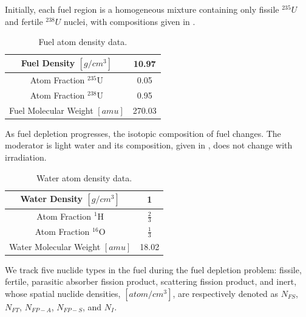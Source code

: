 Initially, each fuel region is a homogeneous mixture containing only fissile $^{235}U$ and fertile $^{238}U$ nuclei, with compositions given in .
\begin{table}[!htp]
\centering
\caption{Fuel atom density data.}
\begin{tabular}{|c|c|}
\hline
Fuel Density $[g/cm^3]$  & 10.97 \\
\hline
Atom Fraction $^{235}\text{U}$	& 0.05 \\
\hline
Atom Fraction $^{238}\text{U}$ & 0.95 \\
\hline
Fuel Molecular Weight $[amu]$ & 270.03\\
\hline
\end{tabular}
\label{tbl:fuel_atom_density}
\end{table}
%
As fuel depletion progresses, the isotopic composition of fuel changes.
The moderator is light water and its composition, given in , does not change with irradiation.
\begin{table}[!htp]
\centering
\caption{Water atom density data.}
\begin{tabular}{|c|c|}
\hline
Water Density $[g/cm^3]$  & 1 \\
\hline
Atom Fraction $^1\text{H}$	& $\frac{2}{3}$ \\
\hline
Atom Fraction $^{16}\text{O}$ & $\frac{1}{3}$ \\
\hline
Water Molecular Weight $[amu]$ & 18.02\\
\hline
\end{tabular}
\label{tbl:water_atom_density}
\end{table}
We track five nuclide types in the fuel during the fuel depletion problem: fissile, fertile, parasitic absorber fission product, scattering fission product, and inert, whose spatial nuclide densities, $[atom/cm^{3}]$, are respectively denoted as $N_{FS}$, $N_{FT}$, $N_{FP-A}$, $N_{FP-S}$, and $N_I$.

